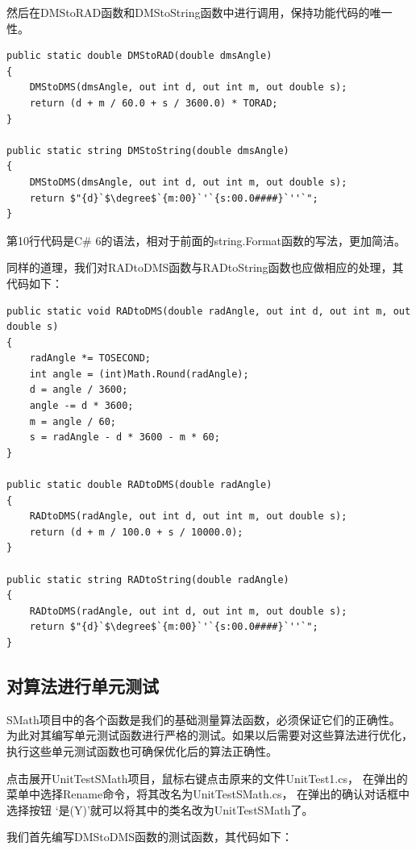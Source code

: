 然后在DMStoRAD函数和DMStoString函数中进行调用，保持功能代码的唯一性。

\begin{lstlisting}
public static double DMStoRAD(double dmsAngle)
{
    DMStoDMS(dmsAngle, out int d, out int m, out double s);
    return (d + m / 60.0 + s / 3600.0) * TORAD;
}

public static string DMStoString(double dmsAngle)
{
    DMStoDMS(dmsAngle, out int d, out int m, out double s);
    return $"{d}`$\degree$`{m:00}`'`{s:00.0####}`''`";
}
\end{lstlisting}

第10行代码是C\# 6的语法，相对于前面的string.Format函数的写法，更加简洁。

同样的道理，我们对RADtoDMS函数与RADtoString函数也应做相应的处理，其代码如下：
\begin{lstlisting}
public static void RADtoDMS(double radAngle, out int d, out int m, out double s)
{
    radAngle *= TOSECOND;
    int angle = (int)Math.Round(radAngle);
    d = angle / 3600;
    angle -= d * 3600;
    m = angle / 60;
    s = radAngle - d * 3600 - m * 60;
}

public static double RADtoDMS(double radAngle)
{
    RADtoDMS(radAngle, out int d, out int m, out double s);
    return (d + m / 100.0 + s / 10000.0);
}

public static string RADtoString(double radAngle)
{
    RADtoDMS(radAngle, out int d, out int m, out double s);
    return $"{d}`$\degree$`{m:00}`'`{s:00.0####}`''`";
}
\end{lstlisting}



\subsection{对算法进行单元测试}

SMath项目中的各个函数是我们的基础测量算法函数，必须保证它们的正确性。
为此对其编写单元测试函数进行严格的测试。如果以后需要对这些算法进行优化，
执行这些单元测试函数也可确保优化后的算法正确性。

点击展开UnitTestSMath项目，鼠标右键点击原来的文件UnitTest1.cs，
在弹出的菜单中选择Rename命令，将其改名为UnitTestSMath.cs，
在弹出的确认对话框中选择按钮 `是(Y)'就可以将其中的类名改为UnitTestSMath了。

我们首先编写DMStoDMS函数的测试函数，其代码如下：


